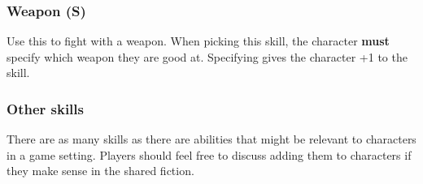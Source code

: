 \subsubsection*{Weapon (S)}
Use this to fight with a weapon. When picking this skill, the character \textbf{must} specify which weapon they are good at. Specifying gives the character +1 to the skill.
\subsubsection*{Other skills}
There are as many skills as there are abilities that might be relevant to characters in a game setting. Players should feel free to discuss adding them to characters if they make sense in the shared fiction.
